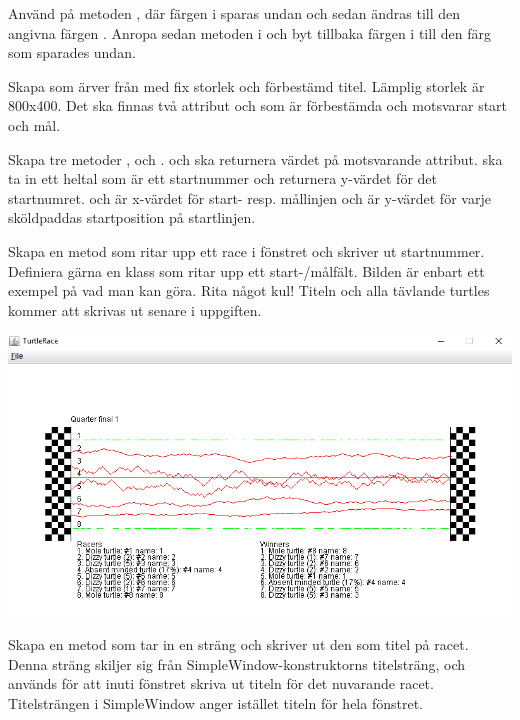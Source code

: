 \Subtask Använd  på metoden , där färgen i  sparas undan och sedan ändras till den angivna färgen . Anropa sedan metoden  i  och byt tillbaka färgen i  till den färg som sparades undan.

\Task {}

\Subtask Skapa  som ärver från  med fix storlek och förbestämd titel. Lämplig storlek är 800x400. Det ska finnas två attribut  och  som är förbestämda och motsvarar start och mål.

\Subtask Skapa tre metoder ,  och .  och  ska returnera värdet på motsvarande attribut.  ska ta in ett heltal  som är ett startnummer och returnera y-värdet för det startnumret.  och  är x-värdet för start- resp. mållinjen och  är y-värdet för varje sköldpaddas startposition på startlinjen.

\Subtask Skapa en metod  som ritar upp ett race i fönstret och skriver ut startnummer. Definiera gärna en klass som ritar upp ett start-/målfält. Bilden är enbart ett exempel på vad man kan göra. Rita något kul! Titeln och alla tävlande turtles kommer att skrivas ut senare i uppgiften.

\includegraphics[width=\textwidth]{../img/turtlerace/RaceWindow}

\Subtask Skapa en metod  som tar in en sträng och skriver ut den som titel på racet. Denna sträng skiljer sig från SimpleWindow-konstruktorns titelsträng, och används för att inuti fönstret skriva ut titeln för det nuvarande racet. Titelsträngen i SimpleWindow anger istället titeln för hela fönstret.

